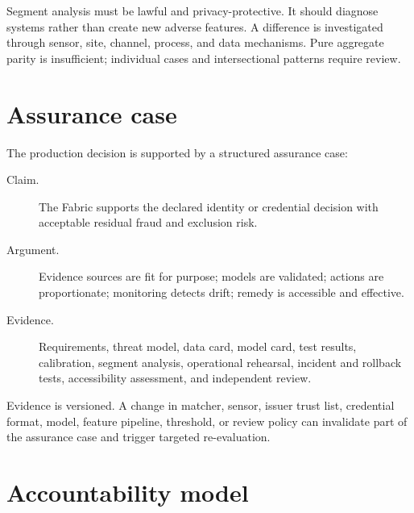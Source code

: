 Segment analysis must be lawful and privacy-protective. It should diagnose systems rather than create new adverse features. A difference is investigated through sensor, site, channel, process, and data mechanisms. Pure aggregate parity is insufficient; individual cases and intersectional patterns require review.

\section{Assurance case}

The production decision is supported by a structured assurance case:

\begin{description}
\item[Claim.] The Fabric supports the declared identity or credential decision with acceptable residual fraud and exclusion risk.
\item[Argument.] Evidence sources are fit for purpose; models are validated; actions are proportionate; monitoring detects drift; remedy is accessible and effective.
\item[Evidence.] Requirements, threat model, data card, model card, test results, calibration, segment analysis, operational rehearsal, incident and rollback tests, accessibility assessment, and independent review.
\end{description}

Evidence is versioned. A change in matcher, sensor, issuer trust list, credential format, model, feature pipeline, threshold, or review policy can invalidate part of the assurance case and trigger targeted re-evaluation.

\section{Accountability model}

